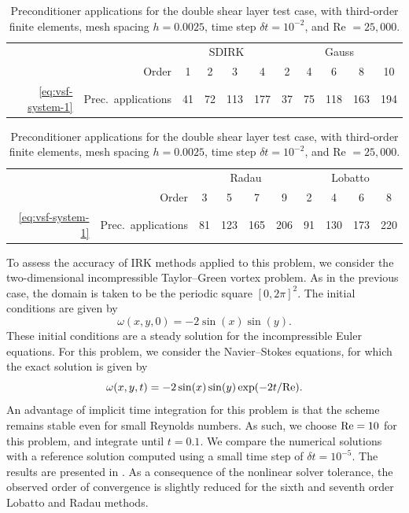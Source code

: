 \documentclass[review]{siamart}
\begin{document}
\begin{table}[h!]
	\centering
	\caption{Preconditioner applications for the double shear layer test case, with third-order
	finite elements, mesh spacing $h=0.0025$, time step $\delta t = 10^{-2}$, and Re $=25,000$.}
	\label{tab:dsl-iters2}
	\begin{tabular}{rl|cccc|ccccc}
		\toprule
		&& \multicolumn{4}{c|}{SDIRK} & \multicolumn{5}{c}{Gauss} \\
		& \multicolumn{1}{r|}{Order}  & 1 & 2 & 3 & 4 & 2 & 4 & 6 & 8 & 10\\
		\midrule
		\eqref{eq:vsf-system-1} & Prec.\ applications & 41 & 72 & 113 & 177 & 37 & 75 & 118 & 163 & 194 \\
		\bottomrule
	\end{tabular}

	\vspace{\floatsep}

	\begin{tabular}{rl|cccc|cccc}
		\toprule
		&& \multicolumn{4}{c|}{Radau} & \multicolumn{4}{c}{Lobatto} \\
		& \multicolumn{1}{r|}{Order} & 3 & 5 & 7 & 9 & 2 & 4 & 6 & 8\\
		\midrule
		\eqref{eq:vsf-system-1} & Prec.\ applications & 81 & 123 & 165 & 206 & 91 & 130 & 173 & 220 \\
		\bottomrule
	\end{tabular}
\end{table}

To assess the accuracy of IRK methods applied to this problem, we consider the two-dimensional incompressible Taylor--Green vortex problem.
As in the previous case, the domain is taken to be the periodic square $[0,2\pi]^2$.
The initial conditions are given by
\[
	\omega(x,y,0) = -2\sin(x)\sin(y).
\]
These initial conditions are a steady solution for the incompressible Euler equations.
For this problem, we consider the Navier--Stokes equations, for which the exact solution is given by
\[
	\omega(x,y,t) = -2\sin(x)\sin(y) \exp(-2t/\rm Re).
\]
An advantage of implicit time integration for this problem is that the scheme remains stable even for small Reynolds numbers.
As such, we choose $\rm Re = 10$ for this problem, and integrate until $t = 0.1$.
We compare the numerical solutions with a reference solution computed using a small time step of $\delta t = 10^{-5}$.
The results are presented in .
As a consequence of the nonlinear solver tolerance, the observed order of convergence is slightly reduced for the sixth and seventh order Lobatto and Radau methods.
\end{document}
